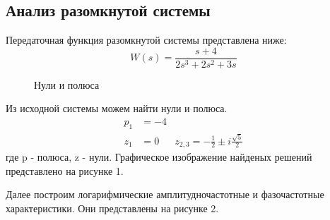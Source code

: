 \documentclass[a4paper, 12pt]{article}
\begin{document}
\newpage
\begin{center}
\section{Анализ разомкнутой системы}
\end{center}

Передаточная функция разомкнутой системы представлена ниже:
\begin{equation}
    W(s) = \frac{s + 4}{2s^3 + 2s^2 + 3s}
\end{equation}

\noindent
\begin{minipage}[t]{0.5\textwidth}
    \begin{figure} [H]
        \centering
        \caption{Нули и полюса}
    \end{figure}
\end{minipage}
\begin{minipage}[t]{0.5\textwidth}
    \vspace{0.5cm}
    Из исходной системы можем найти нули и полюса.
    \begin{align*}
        p_1 & = -4 \\
        z_1 & = 0 & z_{2, 3} = -\frac{1}{2} \pm i\frac{\sqrt{5}}{2}
    \end{align*}
    где p - полюса, z - нули. Графическое изображение найденых решений представлено на рисунке 1.
\end{minipage}
\vspace{0.5cm} \par

Далее построим логарифмические амплитудночастотные и фазочастотные характеристики. Они представлены на рисунке 2.
\end{document}
